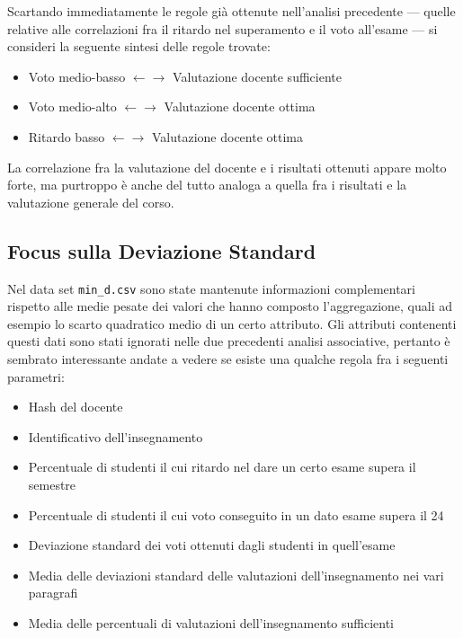             Scartando immediatamente le regole già ottenute nell'analisi precedente --- quelle relative alle correlazioni fra il ritardo nel superamento e il voto all'esame --- si consideri la seguente sintesi delle regole trovate:

            \begin{itemize}
                \item Voto medio-basso $\leftarrow \rightarrow$ Valutazione docente sufficiente
                \item Voto medio-alto $\leftarrow \rightarrow$ Valutazione docente ottima
                \item Ritardo basso $\leftarrow \rightarrow$ Valutazione docente ottima
            \end{itemize}

            La correlazione fra la valutazione del docente e i risultati ottenuti appare molto forte, ma purtroppo è anche del tutto analoga a quella fra i risultati e la valutazione generale del corso.

        \subsection{Focus sulla Deviazione Standard}

        Nel data set \texttt{min\_d.csv} sono state mantenute informazioni complementari rispetto alle medie pesate dei valori che hanno composto l'aggregazione, quali ad esempio lo scarto quadratico medio di un certo attributo. Gli attributi contenenti questi dati sono stati ignorati nelle due precedenti analisi associative, pertanto è sembrato interessante andate a vedere se esiste una qualche regola fra i seguenti parametri:

            \begin{itemize}
                \item Hash del docente
                \item Identificativo dell'insegnamento
                \item Percentuale di studenti il cui ritardo nel dare un certo esame supera il semestre
                \item Percentuale di studenti il cui voto conseguito in un dato esame supera il 24
                \item Deviazione standard dei voti ottenuti dagli studenti in quell'esame
                \item Media delle deviazioni standard delle valutazioni dell'insegnamento nei vari paragrafi
                \item Media delle percentuali di valutazioni dell'insegnamento sufficienti  
            \end{itemize}

